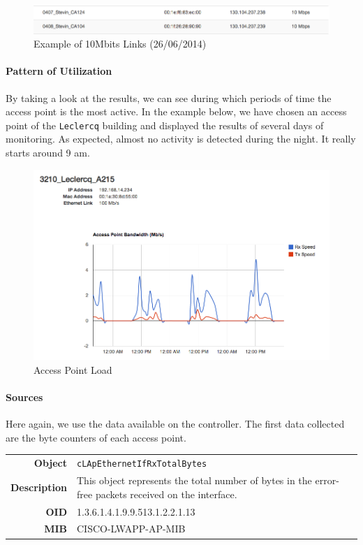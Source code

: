 \begin{figure}[H]
   \includegraphics[width=\textwidth]{Pictures/chapter5/slowLinks.png}
   \caption{Example of 10Mbits Links (26/06/2014)}
\end{figure}

\paragraph*{Pattern of Utilization} By taking a look at the results, we can see during which periods of time the access point is the most active. In the example below, we have chosen an access point of the \texttt{Leclercq} building and displayed the results of several days of monitoring. As expected, almost no activity is detected during the night. It really starts around 9 am. 

\begin{figure}[H]
   \includegraphics[width=\textwidth]{Pictures/chapter5/apLoad.png}
   \caption{Access Point Load}
\end{figure}

\paragraph*{Sources} Here again, we use the data available on the controller. The first data collected are the byte counters of each access point.

\begin{tabular}{|r l|}
\hline
\textbf{Object} & \texttt{cLApEthernetIfRxTotalBytes} \\
\textbf{Description} & \parbox{11cm}{This object represents the total number of bytes in the error-free packets received on the interface.} \\
\textbf{OID} & 1.3.6.1.4.1.9.9.513.1.2.2.1.13 \\
\textbf{MIB} & CISCO-LWAPP-AP-MIB \\
\hline
\end{tabular}

